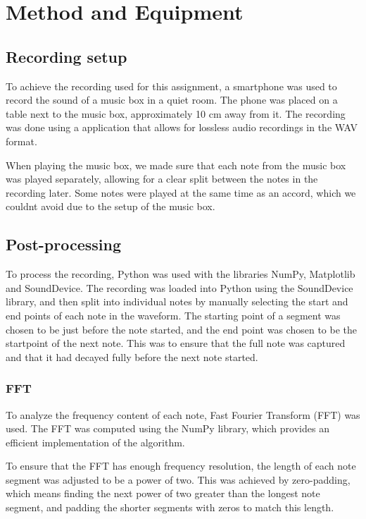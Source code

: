 \chapter{Method and Equipment}

\section{Recording setup}

To achieve the recording used for this assignment, a smartphone was used to record the sound of a music box in a quiet room. The phone was placed on a table next to the music box, approximately 10 cm away from it. The recording was done using a application that allows for lossless audio recordings in the WAV format. 

When playing the music box, we made sure that each note from the music box was played separately, allowing for a clear split between the notes in the recording later. Some notes were played at the same time as an accord, which we couldnt avoid due to the setup of the music box. 

\section{Post-processing}

To process the recording, Python was used with the libraries NumPy, Matplotlib and SoundDevice. The recording was loaded into Python using the SoundDevice library, and then split into individual notes by manually selecting the start and end points of each note in the waveform. The starting point of a segment was chosen to be just before the note started, and the end point was chosen to be the startpoint of the next note. This was to ensure that the full note was captured and that it had decayed fully before the next note started.

\subsection{FFT}

To analyze the frequency content of each note, Fast Fourier Transform (FFT) was used. The FFT was computed using the NumPy library, which provides an efficient implementation of the algorithm.

To ensure that the FFT has enough frequency resolution, the length of each note segment was adjusted to be a power of two. This was achieved by zero-padding, which means finding the next power of two greater than the longest note segment, and padding the shorter segments with zeros to match this length. 

